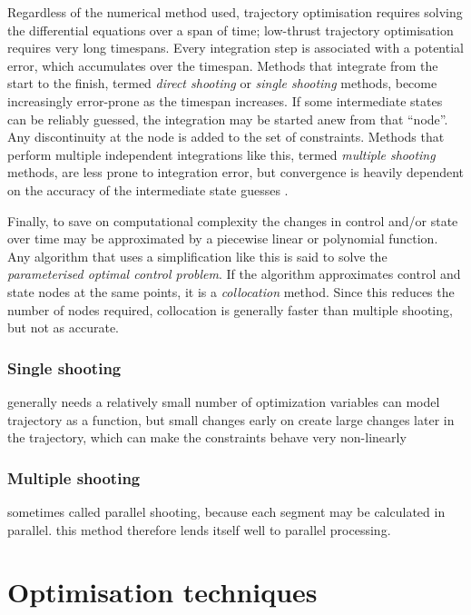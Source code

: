 Regardless of the numerical method used, trajectory optimisation requires solving the differential equations over a span of time; low-thrust trajectory optimisation requires very long timespans. Every integration step is associated with a potential error, which accumulates over the timespan. Methods that integrate from the start to the finish, termed \emph{direct shooting} or \emph{single shooting} methods, become increasingly error-prone as the timespan increases. If some intermediate states can be reliably guessed, the integration may be started anew from that \enquote{node}. Any discontinuity at the node is added to the set of constraints. Methods that perform multiple independent integrations like this, termed \emph{multiple shooting} methods, are less prone to integration error, but convergence is heavily dependent on the accuracy of the intermediate state guesses \parencite{Betts1998, ASTOS_guide}.

Finally, to save on computational complexity the changes in control and/or state over time may be approximated by a piecewise linear or polynomial function. Any algorithm that uses a simplification like this is said to solve the \emph{parameterised optimal control problem}. If the algorithm approximates control and state nodes at the same points, it is a \emph{collocation} method. Since this reduces the number of nodes required, collocation is generally faster than multiple shooting, but not as accurate.%

\subsubsection{Single shooting}
generally needs a relatively small number of optimization variables
can model trajectory as a function, but small changes early on create large changes later in the trajectory, which can make the constraints behave very non-linearly \cite{Betts1998}
\subsubsection{Multiple shooting}
sometimes called parallel shooting, because each segment may be calculated in parallel. this method therefore lends itself well to parallel processing.


\section{Optimisation techniques}\label{sec:Techniques}


